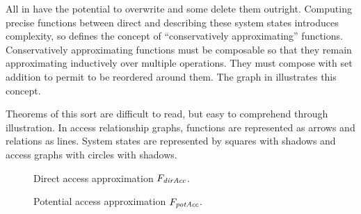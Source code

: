 All \TMops{} in \TMmodelName{} have the potential to overwrite \TMcaps{} and some delete them outright.
Computing precise functions between direct and \TMpotAccAGs{} describing these system states introduces complexity, so \TMmodelName{} defines the concept of ``conservatively approximating'' functions.
Conservatively approximating functions must be composable so that they remain approximating inductively over multiple operations.
They must compose with set addition to permit \TMtransfers{} to be reordered around them.
The graph in  illustrates this concept.

Theorems of this sort are difficult to read, but easy to comprehend through illustration.
In access relationship graphs, functions are represented as arrows and relations as lines.
System states are represented by squares with shadows and access graphs with circles with shadows.

\begin{figure}
\centering
\caption{\label{fig:sketch:directAccessApprox}Direct access approximation \(F_{\textit{dirAcc}{}}\).}
\end{figure}

\begin{figure}
\centering
{}
\caption{\label{fig:sketch:potentialAccessApprox}Potential access approximation \(F_{\textit{potAcc}{}}\).}
\end{figure}

